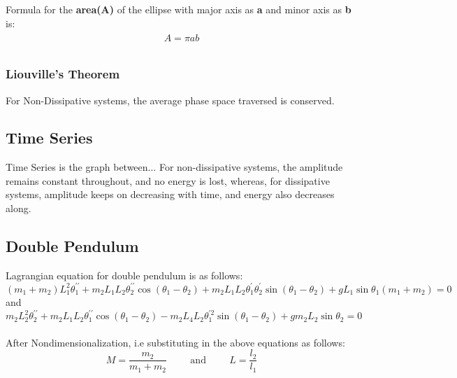 \documentclass[11pt]{scrartcl} %
\begin{document}
Formula for the \textbf{area(A)} of the ellipse with major axis as \textbf{a} and minor axis as \textbf{b} is:
\begin{align} 
	\begin{split}
		A = \pi ab \nonumber\\
	\end{split}					
\end{align}

\subsubsection{Liouville's Theorem}
For Non-Dissipative systems, the average phase space traversed is conserved.

\subsection{Time Series}
Time Series is the graph between... For non-dissipative systems, the amplitude remains constant throughout, and no energy is lost, whereas, for dissipative systems, amplitude keeps on decreasing with time, and energy also decreases along.

\subsection{Double Pendulum}
Lagrangian equation for double pendulum is as follows:
\begin{equation}
\left(m_{1}+m_{2}\right) L_{1}^{2} \theta_{1}^{\prime \prime}+m_{2} L_{1} L_{2} \theta_{2}^{\prime \prime} \cos \left(\theta_{1}-\theta_{2}\right)+m_{2} L_{1} L_{2} \theta_{1}^{\prime} \theta_{2}^{\prime} \sin \left(\theta_{1}-\theta_{2}\right)+g L_{1} \sin \theta_{1}\left(m_{1}+m_{2}\right)=0
\end{equation}
and
\begin{equation}
m_{2} L_{2}^{2} \theta_{2}^{\prime \prime}+m_{2} L_{1} L_{2} \theta_{1}^{\prime \prime} \cos \left(\theta_{1}-\theta_{2}\right)-m_{2} L_{4} L_{2} \theta_{1}^{\prime 2} \sin \left(\theta_{1}-\theta_{2}\right)+g m_{2} L_{2} \sin \theta_{2}=0
\end{equation}
\\
After Nondimensionalization, i.e substituting in the above equations as follows:
\begin{equation*}
M=\frac{m_{2}}{m_{1}+m_{2}} \hspace{1cm} \mbox{and} \hspace{1cm} L=\frac{l_{2}}{l_{1}}
\end{equation*}
\end{document}
